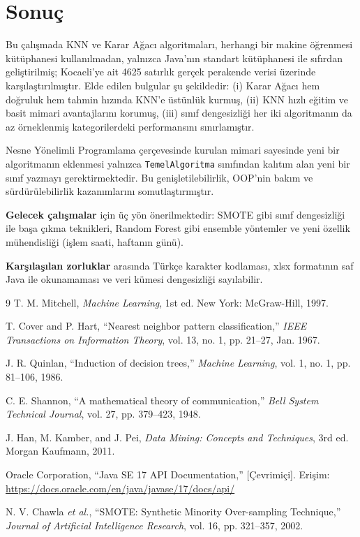 \documentclass[conference]{IEEEtran}
\begin{document}
\section{Sonuç}

Bu çalışmada KNN ve Karar Ağacı algoritmaları, herhangi bir makine öğrenmesi kütüphanesi kullanılmadan, yalnızca Java'nın standart kütüphanesi ile sıfırdan geliştirilmiş; Kocaeli'ye ait 4625 satırlık gerçek perakende verisi üzerinde karşılaştırılmıştır. Elde edilen bulgular şu şekildedir: (i) Karar Ağacı hem doğruluk hem tahmin hızında KNN'e üstünlük kurmuş, (ii) KNN hızlı eğitim ve basit mimari avantajlarını korumuş, (iii) sınıf dengesizliği her iki algoritmanın da az örneklenmiş kategorilerdeki performansını sınırlamıştır.

Nesne Yönelimli Programlama çerçevesinde kurulan mimari sayesinde yeni bir algoritmanın eklenmesi yalnızca \texttt{TemelAlgoritma} sınıfından kalıtım alan yeni bir sınıf yazmayı gerektirmektedir. Bu genişletilebilirlik, OOP'nin bakım ve sürdürülebilirlik kazanımlarını somutlaştırmıştır.

\textbf{Gelecek çalışmalar} için üç yön önerilmektedir: SMOTE gibi sınıf dengesizliği ile başa çıkma teknikleri, Random Forest gibi ensemble yöntemler ve yeni özellik mühendisliği (işlem saati, haftanın günü).

\textbf{Karşılaşılan zorluklar} arasında Türkçe karakter kodlaması, xlsx formatının saf Java ile okunamaması ve veri kümesi dengesizliği sayılabilir.

\begin{thebibliography}{9}
T. M. Mitchell, \emph{Machine Learning}, 1st ed. New York: McGraw-Hill, 1997.

T. Cover and P. Hart, ``Nearest neighbor pattern classification,'' \emph{IEEE Transactions on Information Theory}, vol. 13, no. 1, pp. 21--27, Jan. 1967.

J. R. Quinlan, ``Induction of decision trees,'' \emph{Machine Learning}, vol. 1, no. 1, pp. 81--106, 1986.

C. E. Shannon, ``A mathematical theory of communication,'' \emph{Bell System Technical Journal}, vol. 27, pp. 379--423, 1948.

J. Han, M. Kamber, and J. Pei, \emph{Data Mining: Concepts and Techniques}, 3rd ed. Morgan Kaufmann, 2011.

Oracle Corporation, ``Java SE 17 API Documentation,'' [Çevrimiçi]. Erişim: \url{https://docs.oracle.com/en/java/javase/17/docs/api/}

N. V. Chawla \emph{et al.}, ``SMOTE: Synthetic Minority Over-sampling Technique,'' \emph{Journal of Artificial Intelligence Research}, vol. 16, pp. 321--357, 2002.

\end{thebibliography}
\end{document}
